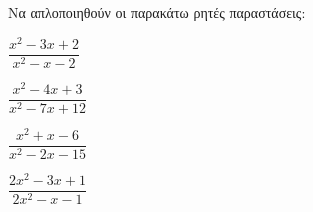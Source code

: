 Να απλοποιηθούν οι παρακάτω ρητές παραστάσεις:
\begin{multicols}{2}
\begin{alist}
\item $ \dfrac{x^2-3x+2}{x^2-x-2} $
\item $ \dfrac{x^2-4x+3}{x^2-7x+12} $
\item $ \dfrac{x^2+x-6}{x^2-2x-15} $
\item $ \dfrac{2x^2-3x+1}{2x^2-x-1} $
\end{alist}
\end{multicols}
